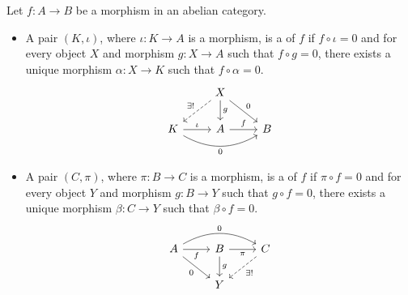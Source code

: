 \documentclass[main.tex]{subfiles}
\begin{document}
\begin{definition}
  \label{def:kernel_cokernel}
  Let $f\colon A \to B$ be a morphism in an abelian category.
  \begin{itemize}
    \item A pair $(K, \iota)$, where $\iota\colon K \to A$ is a morphism, is a  of $f$ if $f \circ \iota = 0$ and for every object $X$ and morphism $g\colon X \to A$ such that $f \circ g = 0$, there exists a unique morphism $\alpha\colon X \to K$ such that $f \circ \alpha = 0$.
      \begin{equation*}
        \begin{tikzcd}
          & X
          \arrow[d, "g"]
          \arrow[dr, "0"]
          \arrow[dl, swap, dashed, "\exists!"]
          \\
          K
          \arrow[r, "\iota"]
          \arrow[rr, bend right, swap, "0"]
          & A
          \arrow[r, "f"]
          & B
        \end{tikzcd}
      \end{equation*}

    \item A pair $(C, \pi)$, where $\pi\colon B \to C$ is a morphism, is a  of $f$ if $\pi \circ f = 0$ and for every object $Y$ and morphism $g\colon B \to Y$ such that $g \circ f = 0$, there exists a unique morphism $\beta\colon C \to Y$ such that $\beta \circ f = 0$.
      \begin{equation*}
        \begin{tikzcd}
          A
          \arrow[r, swap, "f"]
          \arrow[dr, swap, "0"]
          \arrow[rr, bend left, "0"]
          & B
          \arrow[r, swap, "\pi"]
          \arrow[d, "g"]
          & C
          \arrow[dl, dashed, "\exists!"]
          \\
          & Y
        \end{tikzcd}
      \end{equation*}
  \end{itemize}
\end{definition}
\end{document}
